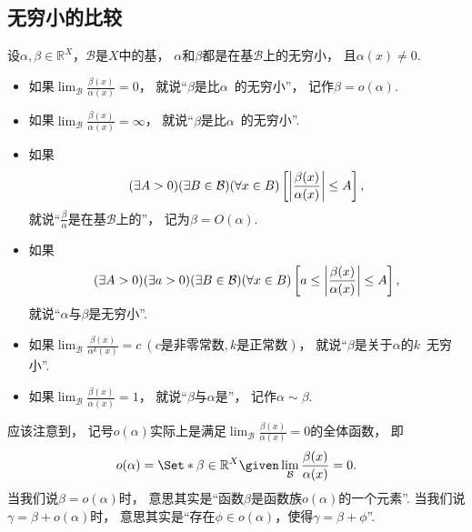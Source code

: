 \subsection{无穷小的比较}
\begin{definition}
设\(\alpha,\beta\in\mathbb{R}^X\)，\(\mathcal{B}\)是\(X\)中的基，
\(\alpha\)和\(\beta\)都是在基\(\mathcal{B}\)上的无穷小，
且\(\alpha(x)\neq0\).
\newcommand{\lf}[1][]{\lim_\mathcal{B} \frac{\beta(x)}{\alpha^{#1}(x)}}
\begin{itemize}
	\item 如果\(\lf=0\)，
	就说“\(\beta\)是比\(\alpha\)~的无穷小”，
	记作\(\beta=o(\alpha)\).

	\item 如果\(\lf=\infty\)，
	就说“\(\beta\)是比\(\alpha\)~的无穷小”.

	\item 如果\[
		(\exists A>0)
		(\exists B\in\mathcal{B})
		(\forall x\in B)
		\left[
			\abs{\frac{\beta(x)}{\alpha(x)}} \leq A
		\right],
	\]
	就说“\(\frac\beta\alpha\)是在基\(\mathcal{B}\)上的”，
	记为\(\beta = O(\alpha)\).

	\item 如果\[
		(\exists A>0)
		(\exists a>0)
		(\exists B\in\mathcal{B})
		(\forall x\in B)
		\left[
			a \leq \abs{\frac{\beta(x)}{\alpha(x)}} \leq A
		\right],
	\]
	就说“\(\alpha\)与\(\beta\)是无穷小”.

	\item 如果\(\lf[k]=c\ (\text{$c$是非零常数},\text{$k$是正常数})\)，
	就说“\(\beta\)是关于\(\alpha\)的\(k\)~无穷小”.

	\item 如果\(\lf=1\)，
	就说“\(\beta\)与\(\alpha\)是”，
	记作\(\alpha\sim\beta\).
\end{itemize}
\end{definition}

\begin{remark}
应该注意到，
记号\(o(\alpha)\)实际上是满足\(\lim_\mathcal{B} \frac{\beta(x)}{\alpha(x)} = 0\)的全体函数，
即\[
	o(\alpha) = \Set*{ \beta\in\mathbb{R}^X \given \lim_\mathcal{B} \frac{\beta(x)}{\alpha(x)} = 0 }.
\]
当我们说\(\beta = o(\alpha)\)时，
意思其实是“函数\(\beta\)是函数族\(o(\alpha)\)的一个元素”.
当我们说\(\gamma = \beta + o(\alpha)\)时，
意思其实是“存在\(\phi\in o(\alpha)\)，使得\(\gamma = \beta + \phi\)”.
\end{remark}


